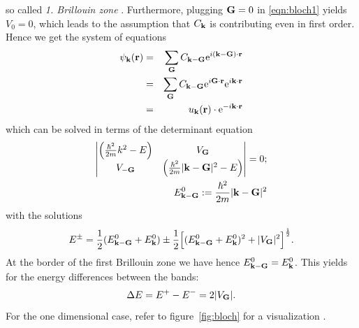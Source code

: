 so called \emph{1. Brillouin zone} .
Furthermore, plugging $\mathbf{G} = 0$ in \eqref{eqn:bloch1} yields $V_0 = 0$, which leads to the assumption that
$C_{\mathbf{k}}$ is contributing even in first order. Hence we get the system of equations 
\begin{eqnarray}
    \psi_{\mathbf{k}}(\mathbf{r})&=& \sum_{\mathbf{G}} C_{\mathbf{k} - \mathbf{G}} \mathrm{e}^{i(\mathbf{k} - \mathbf{G}) \cdot \mathbf{r}} \nonumber \\
            &=& \sum_{\mathbf{G}} C_{\mathbf{k} - \mathbf{G}} \mathrm{e}^{i \mathbf{G} \cdot \mathbf{r}}  \mathrm{e}^{i\mathbf{k} \cdot \mathbf{r}} \nonumber \\
            &=& u_{\mathbf{k}}(\mathbf{r}) \cdot \mathrm{e}^{-i\mathbf{k} \cdot \mathbf{r}}
\end{eqnarray}
which can be solved in terms of the determinant equation
\begin{eqnarray}
    \begin{vmatrix}
        \Big(\frac{\hbar^2}{2m} k^2 - E\Big) & V_{\mathbf{G}} \\
        V_\mathbf{-G}   & \Big(\frac{\hbar^2}{2m} |\mathbf{k} - \mathbf{G}|^2 - E\Big) 
    \end{vmatrix} = 0; \\
    E_{\mathbf{k} - \mathbf{G}}^0 := \frac{\hbar^2}{2m} |\mathbf{k} - \mathbf{G}|^2 \nonumber
\end{eqnarray}
with the solutions
\begin{equation}
    E^\pm = 
    \frac{1}{2}(E_{\mathbf{k} - \mathbf{G}}^0 + E_{\mathbf{k}}^0) \pm 
        \frac{1}{2}\Big[(E_{\mathbf{k} - \mathbf{G}}^0 + E_{\mathbf{k}}^0)^2 + |V_{\mathbf{G}}|^2\Big]^{\frac{1}{2}}.
\end{equation}
At the border of the first Brillouin zone we have hence  $E_{\mathbf{k} - \mathbf{G}}^0 = E_{\mathbf{k}}^0$. 
This yields for the energy differences between the bands:
\begin{equation}
    \Delta E = E^+ - E^- = 2 |V_{\mathbf{G}}|.
\end{equation}
For the one dimensional case, refer to figure~\ref{fig:bloch} for a visualization
\cite{ibach2009festkorperphysik}.

